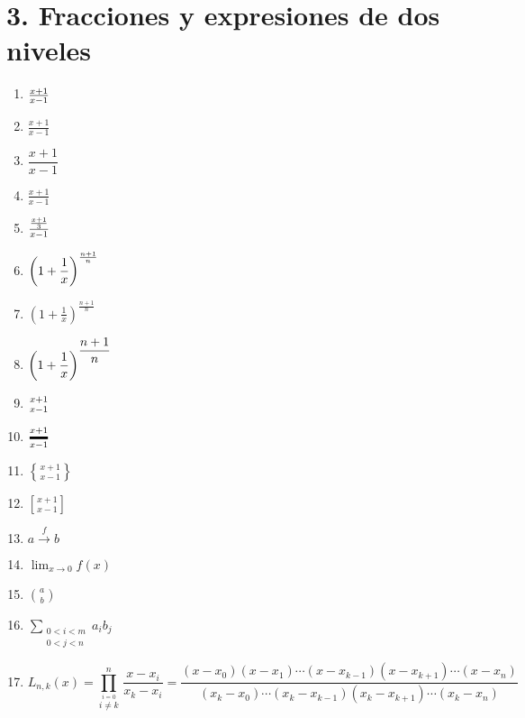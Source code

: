 \documentclass{article} %
\begin{document}
\section*{3. Fracciones y expresiones de dos niveles}
\begin{enumerate}
\setlength\itemsep{1cm}%
\item ${x+1 \over x-1}$

\item $\frac{x+1}{x-1}$

\item $\dfrac{x+1}{x-1}$

\item $\tfrac{x+1}{x-1}$

\item ${{x+1 \over 3} \over x-1}$

\item $\displaystyle{\left( 1+ {1 \over x} \right)^{n+1 \over n}}$

\item $\displaystyle \left( 1+ \frac{1}{x} \right)^\frac{n+1}{n}$

\item $\displaystyle{\left( 1+ {1 \over x} \right)}^{\displaystyle{n+1 \over n}}$

\item ${x+1 \atop x-1}$

\item ${x+1 \above 2pt x-1}$

\item ${x+1 \brace x-1}$

\item ${x+1 \brack x-1}$

\item $\displaystyle{a \stackrel{f}{\rightarrow} b}$

\item $\displaystyle{\lim_{ x \rightarrow 0}} f(x)$

\item $\displaystyle{a \choose b}$

\item $\displaystyle{\sum_{\substack{0<i< m\\0<j<n}}a_ib_j}$
\item $$ L_{n,k}(x)
= \prod_{\overset{i=0}{i\neq k}}^{n}\,\frac{x-x_i}{x_k-x_i}
= \frac{(x-x_0)(x-x_1)\cdots(x-x_{k-1})(x-x_{k+1})\cdots(x-x_n)}{
(x_k-x_0)\cdots (x_k-x_{k-1})(x_k-x_{k+1})\cdots(x_k-x_n)
}  $$
\end{enumerate}
\end{document}
